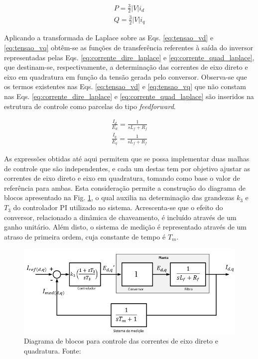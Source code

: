 \begin{align}
	P = \frac{3}{2}|V|i_d\label{eq:potencia_instantanea11}\\
	Q = \frac{3}{2}|V|i_q\label{eq:potencia_instantanea22}
\end{align}

Aplicando a transformada de Laplace sobre as Eqs. \ref{eq:tensao_vd} e \ref{eq:tensao_vq} obtêm-se as funções de transferência referentes à saída do inversor representadas pelas Eqs. \ref{eq:corrente_dire_laplace} e \ref{eq:corrente_quad_laplace}, que destinam-se, respectivamente, a determinação das correntes de eixo direto e eixo em quadratura em função da tensão gerada pelo conversor. Observa-se que os termos existentes nas Eqs. \ref{eq:tensao_vd} e \ref{eq:tensao_vq} que não constam nas Eqs. \ref{eq:corrente_dire_laplace} e \ref{eq:corrente_quad_laplace} são inseridos na estrutura de controle como parcelas do tipo \textit{feedforward}.

\begin{align}
	\frac{I_d}{E_d} = \frac{1}{sL_f + R_f}\label{eq:corrente_dire_laplace}\\
	\frac{I_q}{E_q} = \frac{1}{sL_f + R_f}\label{eq:corrente_quad_laplace}
\end{align}

As expressões obtidas até aqui permitem que se possa implementar duas malhas de controle que são independentes, e cada um destas tem por objetivo ajustar as correntes de eixo direto e eixo em quadratura, tomando como base o valor de referência para ambas. Esta consideração permite a construção do diagrama de blocos apresentado na Fig. \ref{fig:Diagrama_blocos_eixo_dir_quadr}, o qual auxilia na determinação das grandezas $k_3$ e $T_3$ do controlador PI utilizado no sistema. Acrescenta-se que o efeito do conversor, relacionado a dinâmica de chaveamento, é incluído através de um ganho unitário. Além disto, o sistema de medição é representado através de um atraso de primeira ordem, cuja constante de tempo é $T_m$.

\begin{figure}[!hbt]
	\begin{center}
		\includegraphics[width=0.8\columnwidth]{figuras/Diagram_Blocos_Eixo_Direto_Quadratura.PNG}
		\caption{Diagrama de blocos para controle das correntes de eixo direto e quadratura. Fonte: \cite{TeseProfAlex}}
		\label{fig:Diagrama_blocos_eixo_dir_quadr}
	\end{center}
\end{figure}

